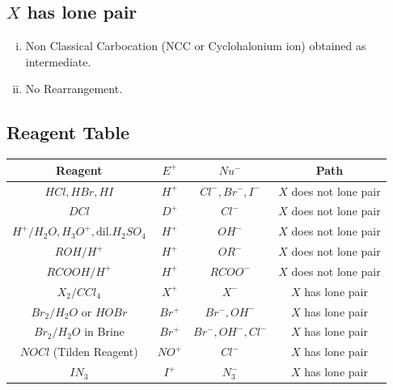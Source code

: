 \documentclass{article}
\begin{document}
\subsection{$X$ has lone pair}
\begin{enumerate}[i.]
    \item Non Classical Carbocation (NCC or Cyclohalonium ion) obtained as intermediate.
    \item No Rearrangement.
\end{enumerate}
\subsection{Reagent Table}

\begin{tabular}{|c| c| c| c| }
    \hline
    Reagent                                         & $E^+$  & $Nu^-$             & Path                   \\[1mm]
    \hline
    $HCl, HBr, HI$                                  & $H^+$  & $Cl^-, Br^-, I^-$  & $X$ does not lone pair \\
    $DCl$                                           & $D^+$  & $Cl^-$             & $X$ does not lone pair \\
    $H^+/H_{2}O, H_{3}O^+, \text{dil.} H_{2}SO_{4}$ & $H^+$  & $OH^-$             & $X$ does not lone pair \\
    $ROH/H^+$                                       & $H^+$  & $OR^-$             & $X$ does not lone pair \\
    $RCOOH/H^+$                                     & $H^+$  & $RCOO^-$           & $X$ does not lone pair \\
    \hline
    $X_{2}/CCl_{4}$                                 & $X^+$  & $X^-$              & $X$ has lone pair      \\
    $Br_{2}/H_{2}O$ or $HOBr$                       & $Br^+$ & $Br^-, OH^-$       & $X$ has lone pair      \\
    $Br_{2}/H_{2}O$ in Brine                        & $Br^+$ & $Br^-, OH^-, Cl^-$ & $X$ has lone pair      \\
    $NOCl$ (Tilden Reagent)                         & $NO^+$ & $Cl^-$             & $X$ has lone pair      \\
    $IN_{3}$                                        & $I^+$  & $N_{3}^-$          & $X$ has lone pair      \\
    \hline
\end{tabular}
\end{document}

